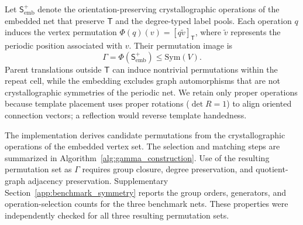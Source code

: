 \documentclass[a5paper, 10pt]{article}
\begin{document}
Let $\mathsf{S}_{\mathrm{emb}}^{+}$ denote the orientation-preserving crystallographic operations of the embedded net that preserve $\mathsf{T}$ and the degree-typed label pools. Each operation $q$ induces the vertex permutation $\Phi(q)(v)=[q\widetilde v]_{\mathsf T}$, where $\widetilde v$ represents the periodic position associated with $v$. Their permutation image is
\begin{equation}
\Gamma=\Phi(\mathsf{S}_{\mathrm{emb}}^{+})\leq\mathrm{Sym}(V).
\label{eq:rotation_group}
\end{equation}
Parent translations outside $\mathsf{T}$ can induce nontrivial permutations within the repeat cell, while the embedding excludes graph automorphisms that are not crystallographic symmetries of the periodic net.
We retain only proper operations because template placement uses proper rotations ($\det R=1$) to align oriented connection vectors; a reflection would reverse template handedness.

The implementation derives candidate permutations from the crystallographic operations of the embedded vertex set. The selection and matching steps are summarized in Algorithm~\ref{alg:gamma_construction}. Use of the resulting permutation set as $\Gamma$ requires group closure, degree preservation, and quotient-graph adjacency preservation. Supplementary Section~\ref{app:benchmark_symmetry} reports the group orders, generators, and operation-selection counts for the three benchmark nets. These properties were independently checked for all three resulting permutation sets.
\end{document}
